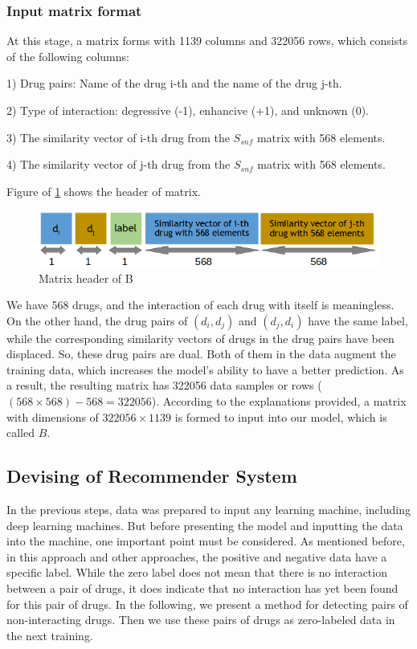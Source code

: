 \documentclass{bmcart}
\begin{document}
\subsubsection*{Input matrix format}

At this stage, a matrix forms with 1139 columns and 322056 rows, which consists of the following columns:

1) Drug pairs: Name of the drug i-th and the name of the drug j-th.

2) Type of interaction: degressive (-1), enhancive (+1), and unknown (0).

3) The similarity vector of i-th drug from the $S_{snf}$ matrix with 568 elements.

4) The similarity vector of j-th drug from the $S_{snf}$ matrix with 568 elements.

Figure of \ref{BMatHeader} shows the header of matrix.

\begin{figure}[!h]
	\centering
	\includegraphics[scale=.53]{MatrixheaderB.png}
	\caption{Matrix header of B}
	\label{BMatHeader}
\end{figure}

We have 568 drugs, and the interaction of each drug with itself is meaningless. On the other hand, the drug pairs of $(d_i, d_j)$ and $(d_j, d_i)$ have the same label, while the corresponding similarity vectors of drugs in the drug pairs have been displaced. So, these drug pairs are dual. Both of them in the data augment the training data, which increases the model's ability to have a better prediction. As a result, the resulting matrix has 322056 data samples or rows ($(568 \times 568) - 568 = 322056$). According to the explanations provided, a matrix with dimensions of $322056 \times 1139$ is formed to input into our model, which is called $B$.

\subsection*{Devising of Recommender System}
In the previous steps, data was prepared to input any learning machine, including deep learning machines. But before presenting the model and inputting the data into the machine, one important point must be considered. As mentioned before, in this approach and other approaches, the positive and negative data have a specific label. While the zero label does not mean that there is no interaction between a pair of drugs, it does indicate that no interaction has yet been found for this pair of drugs. In the following, we present a method for detecting pairs of non-interacting drugs. Then we use these pairs of drugs as zero-labeled data in the next training.
\end{document}
